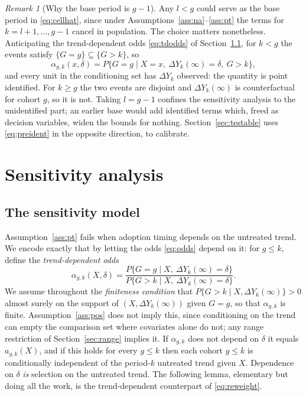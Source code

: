 \documentclass[12pt]{article}
\theoremstyle{remark}
\newtheorem{remark}{Remark}
\begin{document}
\begin{remark}[Why the base period is $g-1$]
\label{rmk:base}
Any $l < g$ could serve as the base period in \eqref{eq:cellhat}, since under
Assumptions~\ref{ass:na}--\ref{ass:pt} the terms for $k = l+1, \ldots, g-1$ cancel in
population. The choice matters nonetheless. Anticipating the trend-dependent odds
\eqref{eq:tdodds} of Section~\ref{sec:model}, for $k < g$ the events satisfy
$\{G{=}g\} \subseteq \{G>k\}$, so
\begin{equation}
\alpha_{g,k}(x,\delta) = P\{G = g \mid X = x,\ \Delta Y_k(\infty) = \delta,\ G > k\},
\label{eq:preident}
\end{equation}
and every unit in the conditioning set has $\Delta Y_k$ observed: the quantity is point
identified. For $k \ge g$ the two events are disjoint and $\Delta Y_k(\infty)$ is
counterfactual for cohort $g$, so it is not. Taking $l = g-1$ confines the sensitivity
analysis to the unidentified part; an earlier base would add identified terms which, freed
as decision variables, widen the bounds for nothing. Section~\ref{sec:testable} uses
\eqref{eq:preident} in the opposite direction, to calibrate.
\end{remark}

\section{Sensitivity analysis}
\label{sec:sens}

\subsection{The sensitivity model}
\label{sec:model}

Assumption~\ref{ass:pt} fails when adoption timing depends on the untreated trend. We
encode exactly that by letting the odds \eqref{eq:odds} depend on it: for $g \le k$,
define the \emph{trend-dependent odds}
\begin{equation}
\alpha_{g,k}(X, \delta)
= \frac{P\{G = g \mid X,\ \Delta Y_k(\infty) = \delta\}}
       {P\{G > k \mid X,\ \Delta Y_k(\infty) = \delta\}}.
\label{eq:tdodds}
\end{equation}
We assume throughout the \emph{finiteness condition} that
$P\{G > k \mid X, \Delta Y_k(\infty)\} > 0$ almost surely on the support of
$(X, \Delta Y_k(\infty))$ given $G = g$, so that $\alpha_{g,k}$ is finite.
Assumption~\ref{ass:pos} does not imply this, since conditioning on the trend can empty
the comparison set where covariates alone do not; any range restriction of
Section~\ref{sec:range} implies it. If $\alpha_{g,k}$ does not depend on $\delta$ it equals
$a_{g,k}(X)$, and if this holds for every $g \le k$ then each cohort $g \le k$ is
conditionally independent of the period-$k$ untreated trend given $X$. Dependence on
$\delta$ \emph{is} selection on the untreated trend. The following lemma, elementary but
doing all the work, is the trend-dependent counterpart of \eqref{eq:reweight}.
\end{document}
